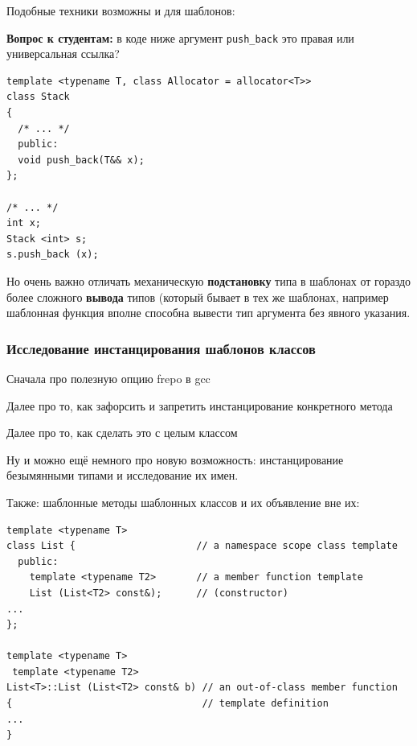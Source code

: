 \documentclass[a4paper,12pt,oneside]{article}
\newif\ifanswers
\begin{document}
\ifanswers
Правильный ответ -- \lstinline!int&! так как для \lstinline!x! будет выведен тип \lstinline!int&!, а потом сработает свертывание ссылок.
\fi

Подобные техники возможны и для шаблонов:

\textbf{Вопрос к студентам:} в коде ниже аргумент \lstinline!push_back! это правая или универсальная ссылка?

\begin{lstlisting}
template <typename T, class Allocator = allocator<T>>
class Stack
{
  /* ... */
  public:
  void push_back(T&& x);
};

/* ... */
int x;
Stack <int> s;
s.push_back (x);
\end{lstlisting}

\ifanswers
Правильный ответ -- правая, так как вывод \lstinline!T! для вектора подставляется, а не выводится. Таким образом будет ошибка компиляции.
\fi

Но очень важно отличать механическую \textbf{подстановку} типа в шаблонах от гораздо более сложного \textbf{вывода} типов (который бывает в тех же шаблонах, например шаблонная функция вполне способна вывести тип аргумента без явного указания.

\subsubsection{Исследование инстанцирования шаблонов классов}\label{ControlInstancing}

Сначала про полезную опцию frepo в gcc

Далее про то, как зафорсить и запретить инстанцирование конкретного метода

Далее про то, как сделать это с целым классом

Ну и можно ещё немного про новую возможность: инстанцирование безымянными типами и исследование их имен.

Также: шаблонные методы шаблонных классов и их объявление вне их:

\begin{lstlisting}
template <typename T> 
class List {                     // a namespace scope class template 
  public: 
    template <typename T2>       // a member function template 
    List (List<T2> const&);      // (constructor) 
...
}; 

template <typename T> 
 template <typename T2> 
List<T>::List (List<T2> const& b) // an out-of-class member function 
{                                 // template definition 
...
} 
\end{lstlisting}
\end{document}
